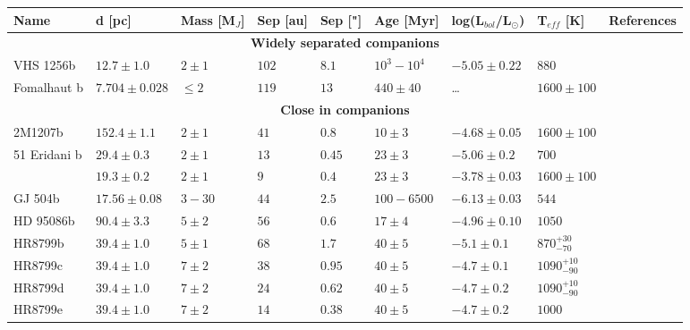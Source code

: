 \begin{landscape}
	\begin{table}[t]
		\centering
		\begin{small}
			\begin{tabular}{lllllllll}
				\toprule
				\textbf{Name} & \textbf{d [pc]} & \textbf{Mass [M$_{J}$]} & \textbf{Sep [au]} & \textbf{Sep ["]} & \textbf{Age [Myr]} & \textbf{log(L$_{bol}$/L$_{\odot}$)} & \textbf{T$_{eff}$ [K]} & \textbf{References}\\
				\midrule
				\multicolumn{9}{c}{\textbf{Widely separated companions}}\\
				\midrule
				VHS 1256b & $12.7\pm1.0$  & $2\pm1$     & $102$ & $8.1$ & $10^{3}-10^{4}$ & $-5.05\pm0.22$ & $880$ & \parencite{Gauza2015}\\
				Fomalhaut b & $7.704\pm0.028$ & $\leq 2$ & $119$ & $13$ & $440\pm40$ & \ldots & $1600\pm100$ &\\
				\midrule
				\multicolumn{9}{c}{\textbf{Close in companions}}\\
				\midrule
				2M1207b   & $152.4\pm1.1$ & $2\pm1$     & $41$ & $0.8$ & $10\pm3$ & $-4.68\pm0.05$ & $1600\pm100$ &\\
				51 Eridani b & $29.4\pm0.3$ & $2\pm1$   & $13$ & $0.45$ & $23\pm3$ & $-5.06\pm0.2$ & $700$ &  \parencite{Macintosh2015}\\
				\bpic     & $19.3\pm0.2$  & $2\pm1$     & $9$ & $0.4$ & $23\pm3$ & $-3.78\pm0.03$ & $1600\pm100$ & \parencite{Quanz2010}\\
				GJ 504b   & $17.56\pm0.08$  & $3-30$    & $44$ & $2.5$ & $100-6500$ & $-6.13\pm0.03$ & $544$ & \parencite{Skemer2016}\\
				HD 95086b & $90.4\pm3.3$  & $5\pm2$     & $56$ & $0.6$ & $17\pm4$ & $-4.96\pm0.10$ & $1050$  &\parencite{DeRosa2016}\\	
				HR8799b   & $39.4\pm1.0$  & $5\pm1$     & $68$ & $1.7$ & $40\pm5$ & $-5.1\pm0.1$ & $870^{+30}_{-70}$ & \parencite{Marois2008,Skemer2012}\\
				HR8799c   & $39.4\pm1.0$  & $7\pm2$     & $38$ & $0.95$ & $40\pm5$ & $-4.7\pm0.1$ & $1090^{+10}_{-90}$ &\parencite{Marois2008,Skemer2012}\\
				HR8799d   & $39.4\pm1.0$  & $7\pm2$     & $24$ & $0.62$ & $40\pm5$ & $-4.7\pm0.2$ & $1090^{+10}_{-90}$ &\parencite{Marois2008,Skemer2012}\\
				HR8799e   & $39.4\pm1.0$  & $7\pm2$     & $14$ & $0.38$ & $40\pm5$ & $-4.7\pm0.2$ & $1000$ &\parencite{Marois2008,Skemer2012}\\	

\end{tabular}
\end{small}
\end{table}
\end{landscape}
